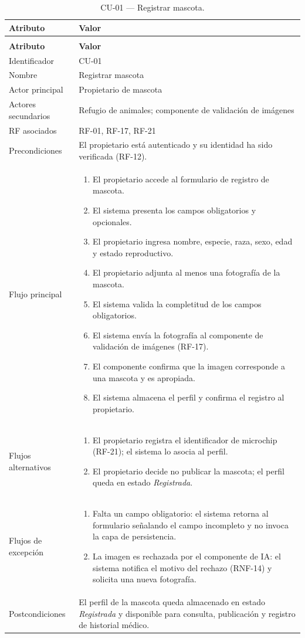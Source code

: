 \documentclass[journal,onecolumn]{IEEEtran}
\makeatletter
\newenvironment{atributos}[2]{%
	\small
	\begin{longtable}{@{}>{\raggedright\arraybackslash}p{4.2cm} >{\raggedright\arraybackslash}p{11.2cm}@{}}
		\caption{#2}\label{tab:#1}\\
		\toprule
		\textbf{Atributo} & \textbf{Valor} \\
		\midrule
		\endfirsthead
		\multicolumn{2}{@{}l}{\small\itshape (continuación)}\\
		\toprule
		\textbf{Atributo} & \textbf{Valor} \\
		\midrule
		\endhead
		\bottomrule
		\endlastfoot
	}{%
	\end{longtable}
	\normalsize
}
\makeatother
\begin{document}
	\begin{atributos}{CU-01}{CU-01 --- Registrar mascota.}
		Identificador & CU-01 \\
		Nombre & Registrar mascota \\
		Actor principal & Propietario de mascota \\
		Actores secundarios & Refugio de animales; componente de validación de imágenes \\
		RF asociados & RF-01, RF-17, RF-21 \\
		Precondiciones & El propietario está autenticado y su identidad ha sido verificada (RF-12). \\
		Flujo principal &
		\begin{enumerate}[leftmargin=*, nosep]
			\item El propietario accede al formulario de registro de mascota.
			\item El sistema presenta los campos obligatorios y opcionales.
			\item El propietario ingresa nombre, especie, raza, sexo, edad y estado reproductivo.
			\item El propietario adjunta al menos una fotografía de la mascota.
			\item El sistema valida la completitud de los campos obligatorios.
			\item El sistema envía la fotografía al componente de validación de imágenes (RF-17).
			\item El componente confirma que la imagen corresponde a una mascota y es apropiada.
			\item El sistema almacena el perfil y confirma el registro al propietario.
		\end{enumerate} \\
		Flujos alternativos &
		\begin{enumerate}[leftmargin=*, nosep]
			\item[3.1] El propietario registra el identificador de microchip (RF-21); el sistema lo asocia al perfil.
			\item[8.1] El propietario decide no publicar la mascota; el perfil queda en estado \emph{Registrada}.
		\end{enumerate} \\
		Flujos de excepción &
		\begin{enumerate}[leftmargin=*, nosep]
			\item[5.1] Falta un campo obligatorio: el sistema retorna al formulario señalando el campo incompleto y no invoca la capa de persistencia.
			\item[7.1] La imagen es rechazada por el componente de IA: el sistema notifica el motivo del rechazo (RNF-14) y solicita una nueva fotografía.
		\end{enumerate} \\
		Postcondiciones & El perfil de la mascota queda almacenado en estado \emph{Registrada} y disponible para consulta, publicación y registro de historial médico. \\
	\end{atributos}
	
\end{document}
